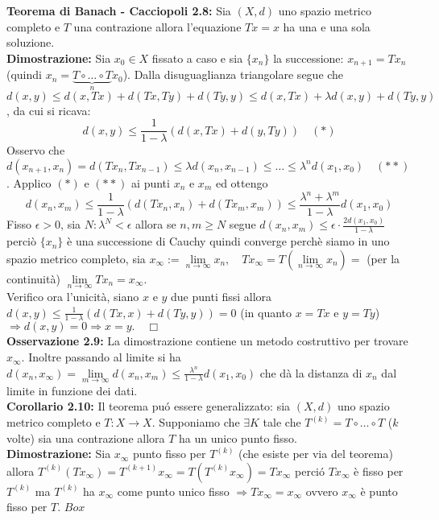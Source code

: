 \documentclass[a4paper,11pt,titlepage]{book}
\begin{document}
\textbf{Teorema di Banach - Cacciopoli 2.8:} Sia $(X,d)$ uno spazio metrico completo e $T$ una contrazione allora l'equazione $Tx=x$ ha una e una sola soluzione.\\

\textbf{Dimostrazione:} Sia $x_0\in X$ fissato a caso e sia $\{x_n\}$ la successione: $x_{n+1}=Tx_n$ (quindi $x_n=\underbrace{ T\circ\ldots\circ T}_{n}x_0$). Dalla disuguaglianza triangolare segue che $d(x,y)\leq d(x,Tx)+d(Tx,Ty)+d(Ty,y)\leq d(x,Tx)+\lambda d(x,y)+d(Ty,y)$, da cui si ricava: $$d(x,y)\leq \frac{1}{1-\lambda}(d(x,Tx)+d(y,Ty))\quad(*)$$ Osservo che $d(x_{n+1},x_n)=d(Tx_n,Tx_{n-1})\leq \lambda d(x_n,x_{n-1})\leq \ldots \leq \lambda^n d(x_1,x_0)\quad(**)$. Applico $(*)$ e $(**)$ ai punti $x_n$ e $x_m$ ed ottengo $$d(x_n,x_m)\leq \frac{1}{1-\lambda}(d(Tx_n,x_n)+d(Tx_m,x_m))\leq \frac{\lambda^n + \lambda^m}{1-\lambda}d(x_1,x_0)$$ Fisso $\epsilon >0$, sia $N: \lambda^N<\epsilon$ allora se $n,m\geq N$ segue $d(x_n,x_m)\leq\epsilon\cdot\frac{2d(x_1,x_0)}{1-\lambda}$ perciò $\{x_n\}$ è una successione di Cauchy quindi converge perchè siamo in uno spazio metrico completo, sia $x_\infty := \lim\limits_{n\to\infty} x_n, \quad Tx_\infty=T(\lim\limits_{n\to\infty} x_n) =$ (per la continuità) $\lim\limits_{n\to\infty} Tx_n=x_\infty$.\\
Verifico ora l'unicità, siano $x$ e $y$ due punti fissi allora $d(x,y)\leq\frac{1}{1-\lambda}(d(Tx,x)+d(Ty,y))=0$ (in quanto $x=Tx$ e $y=Ty$) $\Rightarrow d(x,y)=0\Rightarrow x=y.\quad \Box$\\

\textbf{Osservazione 2.9:} La dimostrazione contiene un metodo costruttivo per trovare $x_\infty$. Inoltre passando al limite si ha $d(x_n,x_\infty)=\lim\limits_{m\to\infty}d(x_n,x_m)\leq\frac{ \lambda ^n}{1-\lambda}d(x_1,x_0)$ che dà la distanza di $x_n$ dal limite in funzione dei dati.\\

\textbf{Corollario 2.10:} Il teorema puó essere generalizzato: sia $(X,d)$ uno spazio metrico completo e $T:X\to X$. Supponiamo che $\exists K$ tale che $T^{(k)}=T\circ\ldots\circ T$ ($k$ volte) sia una contrazione allora $T$ ha un unico punto fisso.\\

\textbf{Dimostrazione:} Sia $x_\infty$ punto fisso per $T^{(k)}$ (che esiste per via del teorema) allora $T^{(k)}(Tx_\infty)=T^{(k+1)}x_\infty=T(T^{(k)} x_\infty)=Tx_\infty$ perció $Tx_\infty$ è fisso per $T^{(k)}$ ma $T^{(k)}$ ha $x_\infty$ come punto unico fisso $\Rightarrow Tx_\infty=x_\infty$ ovvero $x_\infty$ è punto fisso per $T$. $Box$\\
\end{document}
